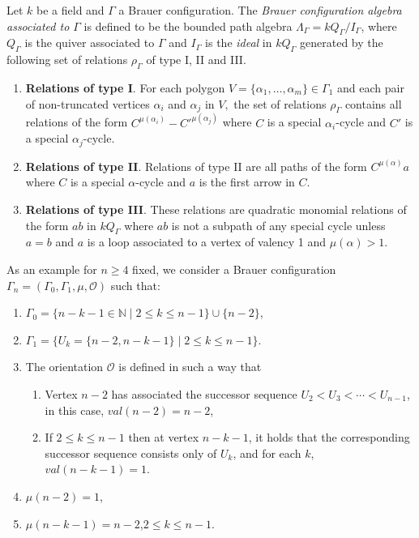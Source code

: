 \documentclass[10pt,twoside]{article}
\theoremstyle{definition}
\begin{document}
\par\smallskip


Let $k$ be a field and $\Gamma$ a Brauer configuration. The \textit{Brauer configuration algebra associated to $\Gamma$} is defined to be the bounded path algebra $\Lambda_{\Gamma}=kQ_{\Gamma}/I_{\Gamma}$, where $Q_{\Gamma}$ is the quiver associated to $\Gamma$ and $I_{\Gamma}$ is the \textit{ideal} in $kQ_{\Gamma}$ generated by the following set of relations $\rho_{\Gamma}$ of type I, II and III.\par\bigskip
\begin{enumerate}
\item \textbf{Relations of type I}. For each polygon $V=\{\alpha_{1},\dots, \alpha_{m}\}\in \Gamma_{1}$ and each pair of non-truncated vertices $\alpha_{i}$ and $\alpha_{j}$ in $V,$ the set of relations $\rho_{\Gamma}$ contains all relations of the form $C^{\mu(\alpha_{i})}-C'^{\mu(\alpha_{j})}$ where $C$ is a special $\alpha_{i}$-cycle
and $C'$ is a special $\alpha_{j}$-cycle.

\item \textbf{Relations of type II}. Relations of type II are all paths of the form $C^{\mu(\alpha)}a$ where $C$ is a special $\alpha$-cycle and $a$ is the first arrow in $C$.

\item \textbf{Relations of type III}. These relations are quadratic monomial relations of the form $ab$ in $kQ_{\Gamma}$ where $ab$ is not a subpath of any special cycle unless $a=b$ and $a$ is a loop associated to a vertex of valency 1 and $\mu(\alpha)>1$.

\end{enumerate}

As an example for $n \geq 4$ fixed, we consider a Brauer configuration $\Gamma_n=(\Gamma_{0},\Gamma_{1},\mu,\mathcal{O})$ such that:
\begin{enumerate}\label{BrauerH}
\item $\Gamma_{0}=\{n-k-1\in\mathbb{N}\mid 2 \leq k \leq n-1\}\cup\{n-2\}$,
\item $\Gamma_{1}=\{U_k=\{n-2,n-k-1\}\mid 2\leq k\leq n-1\}$.
\item The orientation $\mathcal{O}$ is defined in such a way that
\begin{enumerate}[$(a)$]
\item  Vertex $n-2$ has associated the successor sequence  $U_2<U_3<\cdots<U_{n-1}$, in this case, $val(n-2)=n-2$,
\item If $2\leq k\leq n-1$ then at vertex $n-k-1$, it holds that the corresponding successor sequence consists only of $U_k$, and for each $k$, $val(n-k-1)=1$.
\end{enumerate}
\item $\mu(n-2)=1$,
\item $\mu(n-k-1)=n-2$,\quad $2\leq k\leq n-1$.

\end{enumerate}
\end{document}
